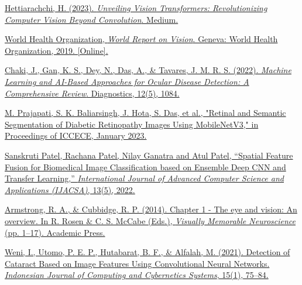 \documentclass{ijclclp}
\begin{document}
\begin{itemize}
\href{https://medium.com/@hansahettiarachchi/unveiling-vision-transformers-revolutionizing-computer-vision-beyond-convolution-c410110ef061}{
Hettiarachchi, H. (2023). \textit{Unveiling Vision Transformers: Revolutionizing Computer Vision Beyond Convolution}. Medium.}




\href{https://www.who.int/publications/i/item/world-report-on-vision}{
World Health Organization, \textit{World Report on Vision}. Geneva: World Health Organization, 2019. [Online].}

\href{https://www.ncbi.nlm.nih.gov/pmc/articles/PMC9071974/}{
Chaki, J., Gan, K. S., Dey, N., Das, A., \& Tavares, J. M. R. S. (2022). \textit{Machine Learning and AI-Based Approaches for Ocular Disease Detection: A Comprehensive Review}. Diagnostics, 12(5), 1084.}

\href{https://doi.org/10.1109/ICCECE51049.2023.10085191}{
M. Prajapati, S. K. Baliarsingh, J. Hota, S. Das, et al., "Retinal and Semantic Segmentation of Diabetic Retinopathy Images Using MobileNetV3," in Proceedings of ICCECE, January 2023.}

\href{http://dx.doi.org/10.14569/IJACSA.2022.0130519}{
Sanskruti Patel, Rachana Patel, Nilay Ganatra and Atul Patel, “Spatial Feature Fusion for Biomedical Image Classification based on Ensemble Deep CNN and Transfer Learning,” \textit{International Journal of Advanced Computer Science and Applications (IJACSA)}, 13(5), 2022.}

\href{https://doi.org/10.1016/B978-0-12-401717-7.00001-0}{
Armstrong, R. A., \& Cubbidge, R. P. (2014). Chapter 1 - The eye and vision: An overview. In R. Rosen \& C. S. McCabe (Eds.), \textit{Visually Memorable Neuroscience} (pp. 1–17). Academic Press.}

\href{https://doi.org/10.22146/ijccs.61882}{
Weni, I., Utomo, P. E. P., Hutabarat, B. F., \& Alfalah, M. (2021). Detection of Cataract Based on Image Features Using Convolutional Neural Networks. \textit{Indonesian Journal of Computing and Cybernetics Systems}, 15(1), 75–84.}


\end{itemize}
\end{document}
